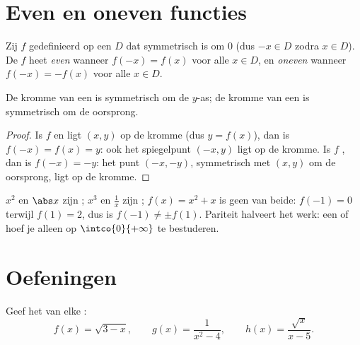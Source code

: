 \section{Even en oneven functies}

\begin{definition}[Pariteit]\label{def:g11:func:parity}
Zij $f$ gedefinieerd op een  $D$ dat symmetrisch is om $0$ (dus
$-x \in D$ zodra $x \in D$). De  $f$ heet \emph{even} wanneer $f(-x) = f(x)$ voor alle $x \in D$, en
\emph{oneven} wanneer $f(-x) = -f(x)$ voor alle
$x \in D$.
\end{definition}

\begin{proposition}\label{prop:g11:func:paritysym}
De kromme van een  is symmetrisch om de $y$-as; de kromme van een
 is symmetrisch om de oorsprong.
\end{proposition}

\begin{proof}
Is $f$  en ligt $(x, y)$ op de kromme (dus $y = f(x)$), dan is
$f(-x) = f(x) = y$: ook het spiegelpunt $(-x, y)$ ligt op de kromme. Is $f$
, dan is $f(-x) = -y$: het punt $(-x, -y)$, symmetrisch met $(x,y)$ om
de oorsprong, ligt op de kromme.
\end{proof}

\begin{example}
$x^2$ en $\abs x$ zijn ; $x^3$ en $\frac1x$ zijn ;
$f(x) = x^2 + x$ is geen van beide: $f(-1) = 0$ terwijl $f(1) = 2$, dus is
$f(-1) \neq \pm f(1)$. Pariteit halveert het werk: een  of 
hoef je alleen op $\intco{0}{+\infty}$ te bestuderen.
\end{example}

\section{Oefeningen}

\begin{exercise}[$\star$]\label{exo:g11:func:1}
Geef het  van elke :
\[
f(x) = \sqrt{3 - x}, \qquad
g(x) = \frac{1}{x^2 - 4}, \qquad
h(x) = \frac{\sqrt{x}}{x - 5} .
\]
\end{exercise}

